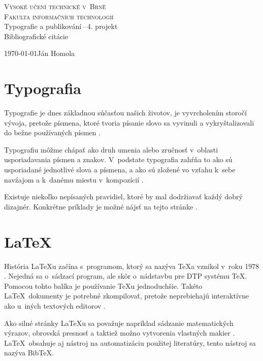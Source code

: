 \documentclass[a4paper, 11pt]{article}
\begin{document}
\begin{titlepage}
    \begin{center}
        \textsc{{\Huge Vysoké učení technické v~Brně}\\[0.4em]
                {\huge Fakulta informačních technologií}}\\
        {\LARGE Typografie a publikování\,--\,4. projekt}\\[0.3em]
        {\Huge Bibliografické citácie}
    \end{center}
{\Large \today \hfill Ján Homola}
\end{titlepage}


\section{Typografia}
Typografie je dnes základnou súčasťou našich životov, je vyvrcholením storočí vývoja, pretože písmena, ktoré tvoria písanie slovo sa vyvinuli a vykryštalizovali do bežne používaných písmen \cite{typography_fundamentals}.

Typografiu môžme chápať ako druh umenia alebo zručnosť v~oblasti usporiadavania písmen a znakov.
V~podstate typografia zahŕňa to ako sú usporiadané jednotlivé slova a písmena, a ako sú zložené vo
vzťahu k~sebe navźajom a k~danému miestu v~kompozícií \cite{harkins2011basics}. 

Existuje niekoľko nepísaných pravidiel, ktoré by mal dodržiavať každý dobrý dizajnér. Konkrétne príklady je možné nájsť na tejto stránke \cite{typho_rules}.


\section{\LaTeX}
História \LaTeX u začína s~programom, ktorý sa nazýva \TeX a vznikol v~roku 1978 \cite{tex_history}.
Nejedná sa o~sádzací program, ale skôr o~nádstavbu pre DTP systému \TeX. Pomocou tohto balíka je používanie \TeX u jednoduchšie. Takéto \LaTeX\ dokumenty je potrebné zkompilovať, pretože neprebiehajú interaktívne ako u~iných textových editorov \cite{diplomka_latex}. 

Ako silné stránky \LaTeX u sa považuje napríklad sádzanie matematických výrazov, obrovská presnosť a taktiež možno vytvorenia vlastných makier \cite{martinek_latex}.
\LaTeX\ obsahuje aj nástroj na automatizáciu použitej literatúry, tento nástroj sa nazýva Bib\TeX \cite{bib}. 
\end{document}
